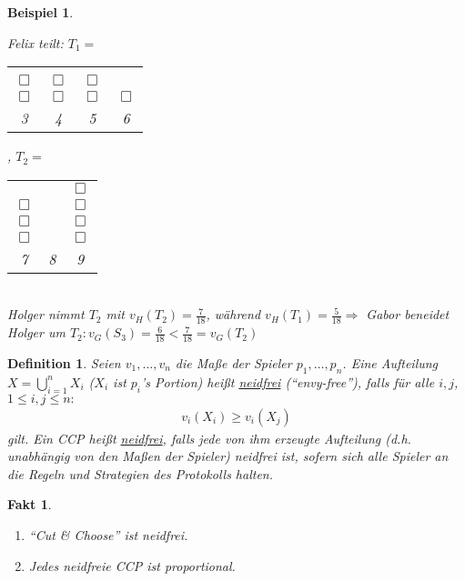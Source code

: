\documentclass[a4paper,10pt]{scrartcl}
\newtheorem*{definition*}{Definition}
\newtheorem*{fakt}{Fakt}
\newtheorem*{beispiel*}{Beispiel}
\begin{document}
\begin{beispiel*}
\begin{enumerate}
    Felix teilt: $T_1=$\begin{tabular}{cccc}\\ \\
                               $\Box$&$\Box$&$\Box$&\\
                               $\Box$&$\Box$&$\Box$&$\Box$\\
                               3&4&5&6
                              \end{tabular}, $T_2=$\begin{tabular}{ccc}
                               & &$\Box$\\
                               $\Box$& &$\Box$\\
                               $\Box$& &$\Box$\\
                               $\Box$& &$\Box$\\
                               7&8&9
                              \end{tabular}\\
    Holger nimmt $T_2$ mit $v_H(T_2)=\frac{7}{18}$, während $v_H(T_1)=\frac{5}{18} \Rightarrow$ Gabor beneidet Holger um $T_2: 
    v_G(S_3)=\frac{6}{18}<\frac{7}{18}=v_G(T_2)$
 \end{enumerate}
\end{beispiel*}
\begin{definition*}
 Seien $v_1,\ldots,v_n$ die Maße der Spieler $p_1,\ldots,p_n$. Eine Aufteilung $X=\bigcup\limits_{i=1}^nX_i$ ($X_i$ ist $p_i$'s Portion)
 heißt \underline{neidfrei} (``envy-free''), falls für alle $i,j$, $1\leq i,j\leq n:$
 \begin{align*}
  v_i(X_i)\geq v_i(X_j)
 \end{align*}gilt.
 Ein CCP heißt \underline{neidfrei}, falls jede von ihm erzeugte Aufteilung (d.h. unabhängig von den Maßen der Spieler) neidfrei ist, sofern
 sich alle Spieler an die Regeln und Strategien des Protokolls halten.
\end{definition*}
\begin{fakt}
 \begin{enumerate}
  \item ``Cut \& Choose'' ist neidfrei.
  \item Jedes neidfreie CCP ist proportional.
 \end{enumerate}
\end{fakt}
\end{document}
